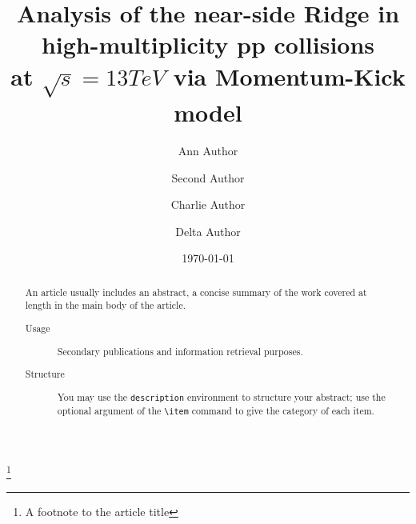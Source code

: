 \documentclass[%
 reprint,
 amsmath,amssymb,
 aps,
]{revtex4-2}
\begin{document}

\title{Analysis of the near-side Ridge in high-multiplicity pp collisions \\ at $\sqrt{s}=13TeV$ via Momentum-Kick model}%
\thanks{A footnote to the article title}%

\author{Ann Author}
\author{Second Author}%
%


\author{Charlie Author}
%
%
\author{Delta Author}
%


\date{\today}%

\begin{abstract}
An article usually includes an abstract, a concise summary of the work
covered at length in the main body of the article. 
\begin{description}
\item[Usage]
Secondary publications and information retrieval purposes.
\item[Structure]
You may use the \texttt{description} environment to structure your abstract;
use the optional argument of the \verb+\item+ command to give the category of each item. 
\end{description}
\end{abstract}

\maketitle
\end{document}

